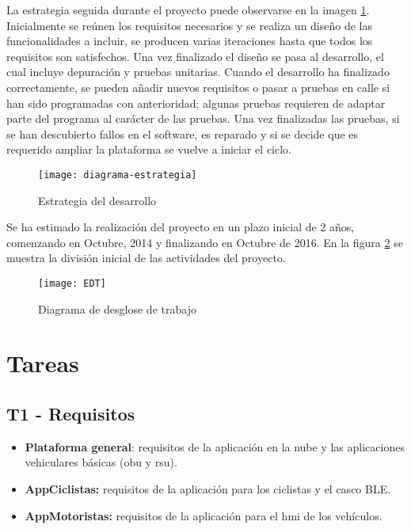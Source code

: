 La estrategia seguida durante el proyecto puede observarse en la imagen \ref{fig:estrategia}.
Inicialmente se reúnen los requisitos necesarios y se realiza un diseño de las funcionalidades
a incluir, se producen varias iteraciones hasta que todos los requisitos son satisfechos. Una
vez finalizado el diseño se pasa al desarrollo, el cual incluye depuración y pruebas unitarias.
Cuando el desarrollo ha finalizado correctamente, se pueden añadir nuevos requisitos o pasar
a pruebas en calle si han sido programadas con anterioridad; algunas pruebas requieren de
adaptar parte del programa al carácter de las pruebas. Una vez finalizadas las pruebas, si se
han descubierto fallos en el software, es reparado y si se decide que es requerido ampliar
la plataforma se vuelve a iniciar el ciclo.
\begin{figure}[H]
	\begin{center}
		\texttt{[image: diagrama-estrategia]}
		\caption{Estrategia del desarrollo}
		\label{fig:estrategia}
	\end{center}
\end{figure}

Se ha estimado la realización del proyecto en un plazo inicial de 2 años, comenzando en Octubre, 2014 y
finalizando en Octubre de 2016. En la figura \ref{fig:EDT} se muestra la división inicial de las actividades
del proyecto.
\begin{figure}[H]
	\begin{center}
		 {
			\texttt{[image: EDT]}
		}
		\caption{Diagrama de desglose de trabajo}
		\label{fig:EDT}
	\end{center}
\end{figure}

\section{Tareas}
\subsection{T1 - Requisitos}
\begin{itemize}
	\item \textbf{Plataforma general}: requisitos de la aplicación en la nube
	y las aplicaciones vehiculares básicas (\gls{obu} y \gls{rsu}).

	\item \textbf{AppCiclistas:} requisitos de la aplicación para los ciclistas
	y el casco BLE.

	\item \textbf{AppMotoristas:} requisitos de la aplicación para el \gls{hmi} de
	los vehículos.
\end{itemize}

